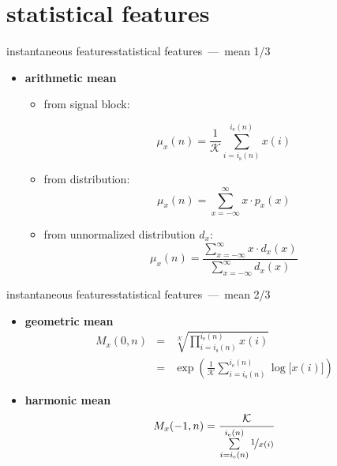     \section[stats]{statistical features}
        \begin{frame}{instantaneous features}{statistical features~---~mean 1/3}
			\begin{itemize}
				\item	\textbf{arithmetic mean}
                    \begin{itemize}
						\item   from signal block:
                        
                        \begin{equation*}\label{eq:arith_mean}
							\mu_x(n) = \frac{1}{\mathcal{K}}\sum\limits_{i=i_{\mathrm{s}}(n)}^{i_{\mathrm{e}}(n)}{x(i)} 
						\end{equation*}
                        \pause
                        \item   from distribution:
                        \begin{equation*}\label{eq:arith_mean2}
							\mu_x(n) = \sum\limits_{x=-\infty}^{\infty}{x\cdot p_x(x)} 
						\end{equation*}
                        \pause
                        \item   from unnormalized distribution $d_x$:
                        \begin{equation*}\label{eq:arith_mean3}
							\mu_x(n) = \frac{\sum\limits_{x=-\infty}^{\infty}{x\cdot d_x(x)}}{\sum\limits_{x=-\infty}^{\infty}{d_x(x)}} 
						\end{equation*}
                    \end{itemize}
            \end{itemize}
        \end{frame}
        \begin{frame}{instantaneous features}{statistical features~---~mean 2/3}
			\begin{itemize}
				\item	\textbf{geometric mean}
				\begin{eqnarray*}
					M_x(0,n)		&=& \sqrt[\mathcal{K}]{\prod\limits_{i=i_{\mathrm{s}}(n)}^{i_{\mathrm{e}}(n)}{x(i)}}\label{eq:geo_mean1}\\
								&=& \exp\left({\frac{1}{\mathcal{K}}\sum\limits_{i=i_{\mathrm{s}}(n)}^{i_{\mathrm{e}}(n)}{\log\big[x(i)\big]}}\right) \label{eq:geo_mean2}
				\end{eqnarray*}
                \pause
				\item	\textbf{harmonic mean}
				\begin{equation*}
					M_x(-1,n) = \frac{\mathcal{K}}{\sum\limits_{i=i_{\mathrm{s}}(n)}^{i_{\mathrm{e}}(n)}{\nicefrac{1}{x(i)}}} 
				\end{equation*}
			\end{itemize}
        \end{frame}
